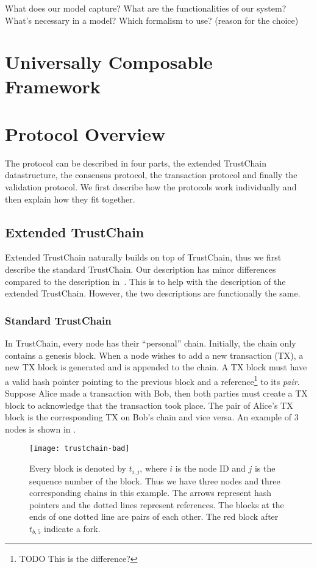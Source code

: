 What does our model capture?
What are the functionalities of our system?
What's necessary in a model?
Which formalism to use? (reason for the choice)

\section{Universally Composable Framework}

\section{Protocol Overview}
The protocol can be described in four parts, the extended TrustChain datastructure, 
the consensus protocol, the transaction protocol and finally the validation protocol.
We first describe how the protocols work individually and then explain how they fit together.

\subsection{Extended TrustChain}
Extended TrustChain naturally builds on top of TrustChain, thus we first describe the standard TrustChain.
Our description has minor differences compared to the description in~\cite{trustchain}.
This is to help with the description of the extended TrustChain.
However, the two descriptions are functionally the same.

\subsubsection*{Standard TrustChain}
In TrustChain, every node has their ``personal'' chain. 
Initially, the chain only contains a genesis block.
When a node wishes to add a new transaction (TX), a new TX block is generated and is appended to the chain.
A TX block must have a valid hash pointer pointing to the previous block
and a reference\footnote{TODO This is the difference?} to its \emph{pair}.
Suppose Alice made a transaction with Bob, then both parties must create a TX block to acknowledge that the transaction took place.
The pair of Alice's TX block is the corresponding TX on Bob's chain and vice versa.
An example of 3 nodes is shown in .

\begin{figure}
    \texttt{[image: trustchain-bad]}
    \centering
    \caption{Every block is denoted by $t_{i,j}$, where $i$ is the node ID and $j$ is the sequence number of the block.
    Thus we have three nodes and three corresponding chains in this example.
    The arrows represent hash pointers and the dotted lines represent references.
    The blocks at the ends of one dotted line are pairs of each other.
    The red block after $t_{b, 5}$ indicate a fork.}
    \label{fig:trustchain-bad}
\end{figure}

